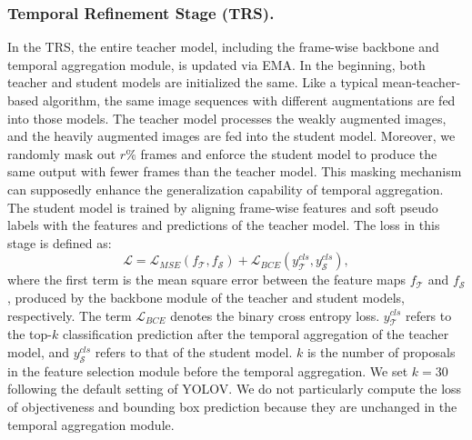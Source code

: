 \subsubsection{Temporal Refinement Stage (TRS).}
In the TRS, the entire teacher model, including the frame-wise backbone and temporal aggregation module, is updated via EMA. In the beginning, both teacher and student models are initialized the same.
Like a typical mean-teacher-based algorithm, the same image sequences with different augmentations are fed into those models. The teacher model processes the weakly augmented images, and the heavily augmented images are fed into the student model. Moreover, we randomly mask out $r\%$ frames and enforce the student model to produce the same output with fewer frames than the teacher model. This masking mechanism can supposedly enhance the generalization capability of temporal aggregation. The student model is trained by aligning frame-wise features and soft pseudo labels with the features and predictions of the teacher model. The loss in this stage is defined as:
\begin{equation}
    \mathcal{L} = \mathcal{L}_{MSE}(f_{\mathcal{T}}, f_{\mathcal{S}}) + \mathcal{L}_{BCE}(y_{\mathcal{T}}^{cls}, y_{\mathcal{S}}^{cls}),
\end{equation}
where the first term is the mean square error between the feature maps $f_{\mathcal{T}}$ and $f_{\mathcal{S}}$, produced by the backbone module of the teacher and student models, respectively. The term $\mathcal{L}_{BCE}$ denotes the binary cross entropy loss. $y_{\mathcal{T}}^{cls}$ refers to the top-$k$ classification prediction after the temporal aggregation of the teacher model, and $y_{\mathcal{S}}^{cls}$ refers to that of the student model. $k$ is the number of proposals in the feature selection module before the temporal aggregation. We set $k=30$ following the default setting of YOLOV. We do not particularly compute the loss of objectiveness and bounding box prediction because they are unchanged in the temporal aggregation module. 


